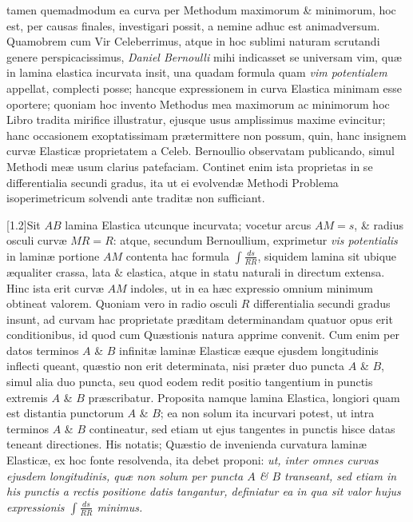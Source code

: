 tamen quemadmodum ea curva per Methodum maximorum \& minimorum, hoc est, per causas finales, investigari possit, a nemine adhuc est animadversum. Quamobrem cum Vir Celeberrimus, atque in hoc sublimi naturam scrutandi genere perspicacissimus, \textit{Daniel Bernoulli} mihi indicasset se universam vim, quæ in lamina elastica incurvata insit, una quadam formula quam \textit{vim potentialem} appellat, complecti posse; hancque expressionem in curva Elastica minimam esse oportere; quoniam hoc invento Methodus mea maximorum ac minimorum hoc Libro tradita mirifice illustratur, ejusque usus amplissimus maxime evincitur; hanc occasionem exoptatissimam prætermittere non possum, quin, hanc insignem curvæ Elasticæ proprietatem a Celeb. Bernoullio observatam publicando, simul Methodi meæ usum clarius patefaciam. Continet enim ista proprietas in se differentialia secundi gradus, ita ut ei evolvendæ Methodi Problema isoperimetricum solvendi ante traditæ non sufficiant.

[1.2\baselineskip]Sit $AB$ lamina Elastica utcunque incurvata; vocetur arcus $AM=s$, \& radius osculi curvæ $MR=R$: atque, secundum Bernoullium, exprimetur \textit{vis potentialis} in laminæ portione $AM$ contenta hac formula $\int\frac{ds}{RR}$, siquidem lamina sit ubique æqualiter crassa, lata \& elastica, atque in statu naturali in directum extensa. Hinc ista erit curvæ $AM$ indoles, ut in ea hæc expressio omnium minimum obtineat valorem. Quoniam vero in radio osculi $R$ differentialia secundi gradus insunt, ad curvam hac proprietate præditam determinandam quatuor opus erit conditionibus, id quod cum Quæstionis natura apprime convenit. Cum enim per datos terminos $A$ \& $B$ infinitæ laminæ Elasticæ eæque ejusdem longitudinis inflecti queant, quæstio non erit determinata, nisi præter duo puncta $A$ \& $B$, simul alia duo puncta, seu quod eodem redit positio tangentium in punctis extremis $A$ \& $B$ præscribatur. Proposita namque lamina Elastica, longiori quam est distantia punctorum $A$ \& $B$; ea non solum ita incurvari potest, ut intra terminos $A$ \& $B$ contineatur, sed etiam ut ejus tangentes in punctis hisce datas teneant directiones. His notatis; Quæstio de invenienda curvatura laminæ Elasticæ, ex hoc fonte resolvenda, ita debet proponi: \textit{ut, inter omnes curvas ejusdem longitudinis, quæ non solum per puncta $A$ \& $B$ transeant, sed etiam in his punctis a rectis positione datis tangantur, definiatur ea in qua sit valor hujus expressionis $\int\frac{ds}{RR}$ minimus.}

